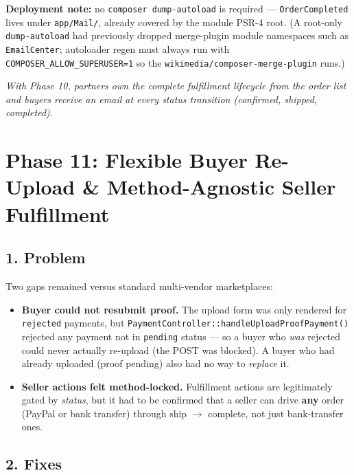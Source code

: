 \documentclass[12pt,a4paper]{article}
\begin{document}
\textbf{Deployment note:} no \texttt{composer dump-autoload} is required — \texttt{OrderCompleted} lives
under \texttt{app/Mail/}, already covered by the module PSR-4 root. (A root-only \texttt{dump-autoload}
had previously dropped merge-plugin module namespaces such as \texttt{EmailCenter}; autoloader regen must
always run with \texttt{COMPOSER\_ALLOW\_SUPERUSER=1} so the \texttt{wikimedia/composer-merge-plugin} runs.)

\vfill
\begin{center}
    \textit{With Phase 10, partners own the complete fulfillment lifecycle from the order list and buyers receive an email at every status transition (confirmed, shipped, completed).}
\end{center}

\section{Phase 11: Flexible Buyer Re-Upload \& Method-Agnostic Seller Fulfillment}

\subsection{1. Problem}

Two gaps remained versus standard multi-vendor marketplaces:
\begin{itemize}
    \item \textbf{Buyer could not resubmit proof.} The upload form was only rendered for \texttt{rejected}
    payments, but \texttt{PaymentController::handleUploadProofPayment()} rejected any payment not in
    \texttt{pending} status — so a buyer who \emph{was} rejected could never actually re-upload (the POST
    was blocked). A buyer who had already uploaded (proof pending) also had no way to \emph{replace} it.
    \item \textbf{Seller actions felt method-locked.} Fulfillment actions are legitimately gated by
    \emph{status}, but it had to be confirmed that a seller can drive \textbf{any} order (PayPal or
    bank transfer) through ship $\rightarrow$ complete, not just bank-transfer ones.
\end{itemize}

\subsection{2. Fixes}
\end{document}
